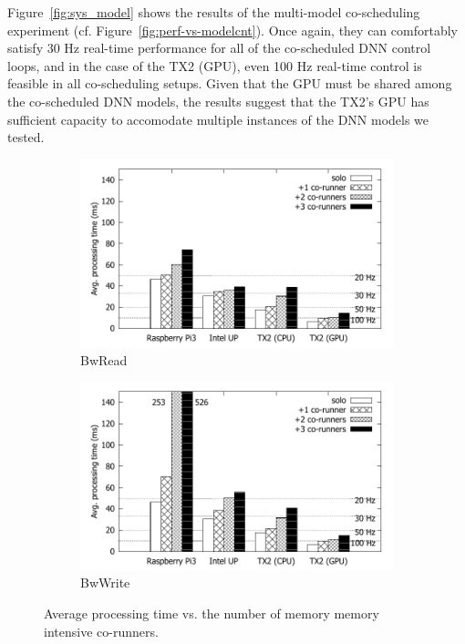 Figure~\ref{fig:sys_model} shows the results of the
multi-model co-scheduling experiment
(cf. Figure~\ref{fig:perf-vs-modelcnt}). Once again, they can comfortably
satisfy 30 Hz real-time performance for all of the co-scheduled DNN control
loops, and in the case of the TX2 (GPU), even 100 Hz real-time control
is feasible in all co-scheduling setups.
Given that the GPU must be shared among the co-scheduled DNN
models, the results suggest that the TX2's GPU has sufficient capacity to
accomodate multiple instances of the DNN models we tested.

\begin{figure}[h]
  \centering
  \begin{subfigure}{0.45\textwidth}
    \includegraphics[width=\textwidth]{figs/compare_benchmark_read}
    \caption{BwRead}
    \label{fig:sys_bench_read}
  \end{subfigure}
  \hfill
  \begin{subfigure}{0.45\textwidth}
    \includegraphics[width=\textwidth]{figs/compare_benchmark}
    \caption{BwWrite}
    \label{fig:sys_bench_write}    
  \end{subfigure}
  \caption{Average processing time vs. the number of memory
    memory intensive co-runners.}
  \label{fig:sys_bench}    
\end{figure} 

